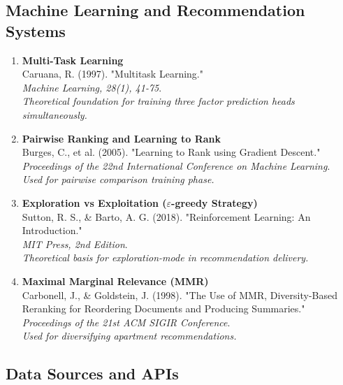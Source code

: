 \documentclass[12pt,a4paper]{article}
\begin{document}
\subsection{Machine Learning and Recommendation Systems}

\begin{enumerate}[resume]
    \item \textbf{Multi-Task Learning}\\
    Caruana, R. (1997). "Multitask Learning." \\
    \textit{Machine Learning, 28(1), 41-75}.\\
    \textit{Theoretical foundation for training three factor prediction heads simultaneously.}
    
    \item \textbf{Pairwise Ranking and Learning to Rank}\\
    Burges, C., et al. (2005). "Learning to Rank using Gradient Descent." \\
    \textit{Proceedings of the 22nd International Conference on Machine Learning}.\\
    \textit{Used for pairwise comparison training phase.}
    
    \item \textbf{Exploration vs Exploitation ($\varepsilon$-greedy Strategy)}\\
    Sutton, R. S., \& Barto, A. G. (2018). "Reinforcement Learning: An Introduction." \\
    \textit{MIT Press, 2nd Edition}.\\
    \textit{Theoretical basis for exploration-mode in recommendation delivery.}
    
    \item \textbf{Maximal Marginal Relevance (MMR)}\\
    Carbonell, J., \& Goldstein, J. (1998). "The Use of MMR, Diversity-Based Reranking for Reordering Documents and Producing Summaries." \\
    \textit{Proceedings of the 21st ACM SIGIR Conference}.\\
    \textit{Used for diversifying apartment recommendations.}
\end{enumerate}

\subsection{Data Sources and APIs}
\end{document}
